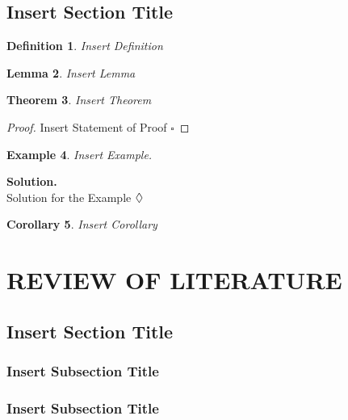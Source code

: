\documentclass[12pt,a4paper,oneside]{book}
\theoremstyle{plain}
\newtheorem{thm}{Theorem}[chapter]
\newtheorem{lem}[thm]{Lemma}
\newtheorem{cor}[thm]{Corollary}
\newtheorem{ex}[thm]{Example}
\newtheorem{de}[thm]{Definition}
\numberwithin{equation}{chapter} \DeclareMathOperator{\Var}{Var}
\newcommand*{\QEDA}{\hfill\ensuremath{\large{\lozenge}}}
\newcommand*{\QEDAa}{\hfill\ensuremath{\square}}
\begin{document}
\section{Insert Section Title}\label{Sec2.1}

\begin{de}\label{def1}
	Insert Definition
\end{de}

\vspace{1cm}

\begin{lem}\label{lem1}
	Insert Lemma
\end{lem}

\vspace{1cm}

\begin{thm}\label{thm1}
	Insert Theorem
\end{thm}

\noindent\begin{proof}
	Insert Statement of Proof
	\QEDAa
\end{proof}

\vspace{1cm}

\begin{ex}\label{ex1}
	Insert Example.
\end{ex}
\noindent\textbf{Solution.}\\
Solution for the Example \QEDA

\vspace{1cm}

\begin{cor}
	Insert Corollary
\end{cor}


\chapter{REVIEW OF LITERATURE}
\section{Insert Section Title}\label{Sec3.1}
\subsection{Insert Subsection Title}\label{sub3.1.1}
\subsection{Insert Subsection Title}\label{sub3.1.2}
\end{document}
